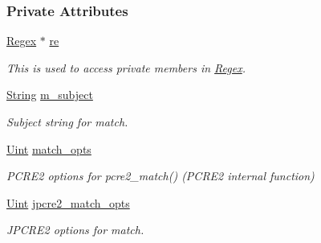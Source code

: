 \subsubsection*{Private Attributes}
\begin{DoxyCompactItemize}
\item 
\hypertarget{classjpcre2_1_1RegexMatch_a7743b27db00c1e13d8fee51b70d5a133}{}\label{classjpcre2_1_1RegexMatch_a7743b27db00c1e13d8fee51b70d5a133} 
\hyperlink{classjpcre2_1_1Regex}{Regex} $\ast$ \hyperlink{classjpcre2_1_1RegexMatch_a7743b27db00c1e13d8fee51b70d5a133}{re}
\begin{DoxyCompactList}\small\item\em This is used to access private members in \hyperlink{classjpcre2_1_1Regex}{Regex}. \end{DoxyCompactList}\item 
\hypertarget{classjpcre2_1_1RegexMatch_a9df4f1897e7fa33e05a9f6f938992ca7}{}\label{classjpcre2_1_1RegexMatch_a9df4f1897e7fa33e05a9f6f938992ca7} 
\hyperlink{namespacejpcre2_a91f03070152fb228bc116c5a737f1d16}{String} \hyperlink{classjpcre2_1_1RegexMatch_a9df4f1897e7fa33e05a9f6f938992ca7}{m\+\_\+subject}
\begin{DoxyCompactList}\small\item\em Subject string for match. \end{DoxyCompactList}\item 
\hypertarget{classjpcre2_1_1RegexMatch_a697d5731007350b0f20d2018fcfafa90}{}\label{classjpcre2_1_1RegexMatch_a697d5731007350b0f20d2018fcfafa90} 
\hyperlink{namespacejpcre2_a078242d38221a13fb3543b9edd78c099}{Uint} \hyperlink{classjpcre2_1_1RegexMatch_a697d5731007350b0f20d2018fcfafa90}{match\+\_\+opts}
\begin{DoxyCompactList}\small\item\em P\+C\+R\+E2 options for pcre2\+\_\+match() (P\+C\+R\+E2 internal function) \end{DoxyCompactList}\item 
\hypertarget{classjpcre2_1_1RegexMatch_a70d62df887eeed237724f64fbc378700}{}\label{classjpcre2_1_1RegexMatch_a70d62df887eeed237724f64fbc378700} 
\hyperlink{namespacejpcre2_a078242d38221a13fb3543b9edd78c099}{Uint} \hyperlink{classjpcre2_1_1RegexMatch_a70d62df887eeed237724f64fbc378700}{jpcre2\+\_\+match\+\_\+opts}
\begin{DoxyCompactList}\small\item\em J\+P\+C\+R\+E2 options for match. \end{DoxyCompactList}\item 

\end{DoxyCompactItemize}

